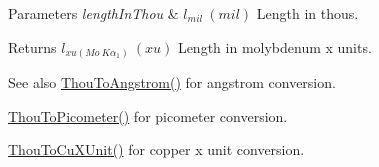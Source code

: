 \begin{DoxyParams}{Parameters}
{\em length\+In\+Thou} & $ l_{mil}\ (mil)$ Length in thous. \\
\hline
\end{DoxyParams}
\begin{DoxyReturn}{Returns}
$ l_{xu(Mo\ K\alpha_1)}\ (xu)$ Length in molybdenum x units. 
\end{DoxyReturn}
\begin{DoxySeeAlso}{See also}
\mbox{\hyperlink{group___e_g_x_math-_conversions-_length_conversions-_imperial-_thou-_non-_s_i_ga5d852bdec8556e4b6bde1445f5f74a20}{Thou\+To\+Angstrom()}} for angstrom conversion. 

\mbox{\hyperlink{group___e_g_x_math-_conversions-_length_conversions-_imperial-_thou-_s_i_gabc7a92b07f617bdf0ac0249d34c4aa4c}{Thou\+To\+Picometer()}} for picometer conversion. 

\mbox{\hyperlink{group___e_g_x_math-_conversions-_length_conversions-_imperial-_thou-_non-_s_i_ga5614deb555c0360dfdaa94d01ad35b17}{Thou\+To\+Cu\+X\+Unit()}} for copper x unit conversion. 
\end{DoxySeeAlso}
